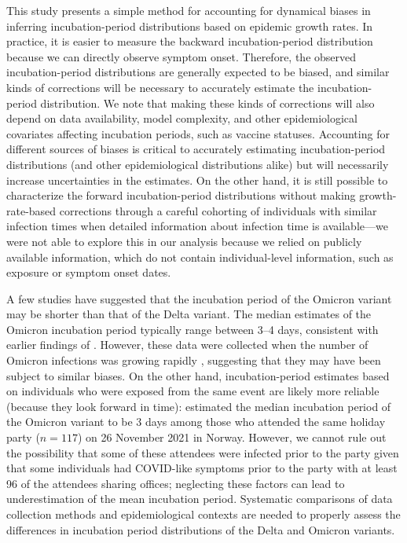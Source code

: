 \documentclass[12pt]{article}
\begin{document}
This study presents a simple method for accounting for dynamical biases in inferring incubation-period distributions based on epidemic growth rates.
In practice, it is easier to measure the backward incubation-period distribution because we can directly observe symptom onset. 
Therefore, the observed incubation-period distributions are generally expected to be biased, and similar kinds of corrections will be necessary to accurately estimate the incubation-period distribution.
We note that making these kinds of corrections will also depend on data availability, model complexity, and other epidemiological covariates affecting incubation periods, such as vaccine statuses. 
Accounting for different sources of biases is critical to accurately estimating incubation-period distributions (and other epidemiological distributions alike) but will necessarily increase uncertainties in the estimates.
On the other hand, it is still possible to characterize the forward incubation-period distributions without making growth-rate-based corrections through a careful cohorting of individuals with similar infection times when detailed information about infection time is available---we were not able to explore this in our analysis because we relied on publicly available information, which do not contain individual-level information, such as exposure or symptom onset dates.

A few studies have suggested that the incubation period of the Omicron variant may be shorter than that of the Delta variant.
The median estimates of the Omicron incubation period typically range between 3--4 days, consistent with earlier findings of \citep{backer2021omicron}. 
However, these data were collected when the number of Omicron infections was growing rapidly \citep{jansen2021investigation,song2022serial}, suggesting that they may have been subject to similar biases.
On the other hand, incubation-period estimates based on individuals who were exposed from the same event are likely more reliable (because they look forward in time):
\cite{brandal2021outbreak} estimated the median incubation period of the Omicron variant to be 3 days among those who attended the same holiday party ($n=117$) on 26 November 2021 in Norway. 
However, we cannot rule out the possibility that some of these attendees were infected prior to the party given that some individuals had COVID-like symptoms prior to the party with at least 96 of the attendees sharing offices; neglecting these factors can lead to underestimation of the mean incubation period.
Systematic comparisons of data collection methods and epidemiological contexts are needed to properly assess the differences in incubation period distributions of the Delta and Omicron variants.
\end{document}
